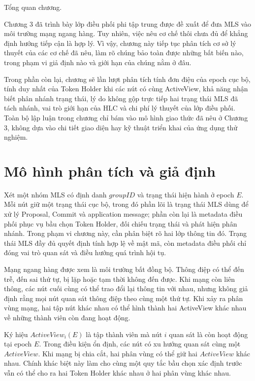 \documentclass[../DoAn.tex]{subfiles}
\begin{document}
Tổng quan chương.

Chương 3 đã trình bày lớp điều phối phi tập trung được đề xuất để đưa MLS vào môi trường mạng ngang hàng. Tuy nhiên, việc nêu cơ chế thôi chưa đủ để khẳng định hướng tiếp cận là hợp lý. Vì vậy, chương này tiếp tục phân tích cơ sở lý thuyết của các cơ chế đã nêu, làm rõ chúng bảo toàn được những bất biến nào, trong phạm vi giả định nào và giới hạn của chúng nằm ở đâu.

Trong phần còn lại, chương sẽ lần lượt phân tích tính đơn điệu của epoch cục bộ, tính duy nhất của Token Holder khi các nút có cùng ActiveView, khả năng nhận biết phân nhánh trạng thái, lý do không gộp trực tiếp hai trạng thái MLS đã tách nhánh, vai trò giới hạn của HLC và chi phí lý thuyết của lớp điều phối. Toàn bộ lập luận trong chương chỉ bám vào mô hình giao thức đã nêu ở Chương 3, không dựa vào chi tiết giao diện hay kỹ thuật triển khai của ứng dụng thử nghiệm.

\section{Mô hình phân tích và giả định}
\label{sec:mo_hinh_phan_tich}

Xét một nhóm MLS có định danh $groupID$ và trạng thái hiện hành ở epoch $E$. Mỗi nút giữ một trạng thái cục bộ, trong đó phần lõi là trạng thái MLS dùng để xử lý Proposal, Commit và application message; phần còn lại là metadata điều phối phục vụ bầu chọn Token Holder, đối chiếu trạng thái và phát hiện phân nhánh. Trong phạm vi chương này, cần phân biệt rõ hai lớp thông tin đó. Trạng thái MLS đầy đủ quyết định tính hợp lệ về mật mã, còn metadata điều phối chỉ đóng vai trò quan sát và điều hướng quá trình hội tụ.

Mạng ngang hàng được xem là môi trường bất đồng bộ. Thông điệp có thể đến trễ, đến sai thứ tự, bị lặp hoặc tạm thời không đến được. Khi mạng còn liên thông, các nút cuối cùng có thể trao đổi lại thông tin với nhau, nhưng không giả định rằng mọi nút quan sát thông điệp theo cùng một thứ tự. Khi xảy ra phân vùng mạng, hai tập nút khác nhau có thể hình thành hai ActiveView khác nhau về những thành viên còn đang hoạt động.

Ký hiệu $ActiveView_i(E)$ là tập thành viên mà nút $i$ quan sát là còn hoạt động tại epoch $E$. Trong điều kiện ổn định, các nút có xu hướng quan sát cùng một $ActiveView$. Khi mạng bị chia cắt, hai phân vùng có thể giữ hai $ActiveView$ khác nhau. Chính khác biệt này làm cho cùng một quy tắc bầu chọn xác định trước vẫn có thể cho ra hai Token Holder khác nhau ở hai phân vùng khác nhau.
\end{document}
